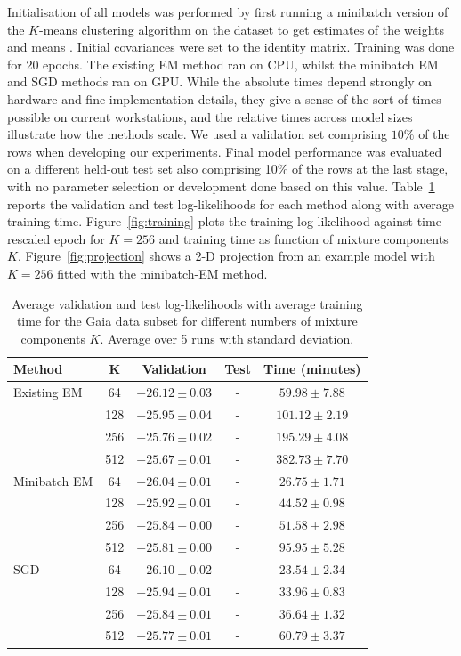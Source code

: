 \documentclass{article}
\begin{document}
Initialisation of all models was performed by first running a minibatch version of the $K$-means clustering algorithm on the dataset to get estimates of the weights and means \cite{sculleyWebscaleKmeansClustering2010}.
Initial covariances were set to the identity matrix.
Training was done for 20 epochs.
The existing EM method ran on CPU, whilst the minibatch EM and SGD methods ran on GPU\@.
While the absolute times depend strongly on hardware and fine implementation details, they give a sense of the sort of times possible on current workstations, and the relative times across model sizes illustrate how the methods scale.
We used a validation set comprising $10\%$ of the rows when developing our experiments.
Final model performance was evaluated on a different held-out test set also comprising 10\% of the rows at the last stage, with no parameter selection or development done based on this value.
Table~\ref{results-table} reports the validation and test log-likelihoods for each method along with average training time.
Figure~\ref{fig:training} plots the training log-likelihood against time-rescaled epoch for $K=256$ and training time as function of mixture components $K$.
Figure~\ref{fig:projection} shows a 2-D projection from an example model with $K=256$ fitted with the minibatch-EM method.

\begin{table}{}
  \caption{Average validation and test log-likelihoods with average training time for the Gaia data subset for different numbers of mixture components $K$.  Average over 5 runs with standard deviation.}
  \label{results-table}
  \centering
  \begin{tabular}{lcccc}
      \toprule
      Method     & K &  Validation     & Test & Time (minutes) \\
      \midrule
      Existing EM & 64 & $-26.12 \pm 0.03$ & - & $59.98 \pm 7.88$ \\
      \citet{bovyExtremeDeconvolutionInferring2011} & 128 & $-25.95 \pm 0.04$ & - & $101.12 \pm 2.19$ \\
       & 256 & $-25.76 \pm 0.02$ & - & $195.29 \pm 4.08$ \\
       & 512 & $-25.67 \pm 0.01$ & - & $382.73 \pm 7.70$ \\
      \midrule
      Minibatch EM & 64 & $-26.04 \pm 0.01$ & - & $26.75 \pm 1.71$ \\
       & 128 & $-25.92 \pm 0.01$ & - & $44.52 \pm 0.98$ \\
       & 256 & $-25.84 \pm 0.00$ & - & $51.58 \pm 2.98$ \\
       & 512 & $-25.81 \pm 0.00$ & - & $95.95 \pm 5.28$ \\
      \midrule
      SGD & 64 & $-26.10 \pm 0.02$ & - & $23.54 \pm 2.34$ \\
       & 128 & $-25.94 \pm 0.01$ & - & $33.96 \pm 0.83$ \\
       & 256 & $-25.84 \pm 0.01$ & - & $36.64 \pm 1.32$ \\
       & 512 & $-25.77 \pm 0.01$ & - & $60.79 \pm 3.37$ \\
      \bottomrule
  \end{tabular}
\end{table}
\end{document}
